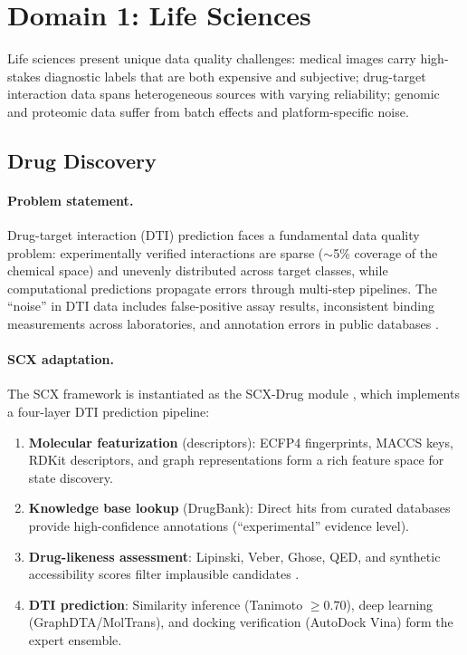 \documentclass[twocolumn]{article}
\theoremstyle{definition}
\begin{document}
\section{Domain 1: Life Sciences}

Life sciences present unique data quality challenges: medical images carry high-stakes diagnostic labels that are both expensive and subjective; drug-target interaction data spans heterogeneous sources with varying reliability; genomic and proteomic data suffer from batch effects and platform-specific noise.

\subsection{Drug Discovery}

\paragraph{Problem statement.}
Drug-target interaction (DTI) prediction faces a fundamental data quality problem: experimentally verified interactions are sparse ($\sim$5\% coverage of the chemical space) and unevenly distributed across target classes, while computational predictions propagate errors through multi-step pipelines. The ``noise'' in DTI data includes false-positive assay results, inconsistent binding measurements across laboratories, and annotation errors in public databases \cite{chembl, bindingdb}.

\paragraph{SCX adaptation.}
The SCX framework is instantiated as the SCX-Drug module \cite{scxlife}, which implements a four-layer DTI prediction pipeline:

\begin{enumerate}[nosep,leftmargin=*,itemsep=2pt]
  \item \textbf{Molecular featurization} (descriptors): ECFP4 fingerprints, MACCS keys, RDKit descriptors, and graph representations form a rich feature space for state discovery.
  \item \textbf{Knowledge base lookup} (DrugBank): Direct hits from curated databases provide high-confidence annotations (``experimental'' evidence level).
  \item \textbf{Drug-likeness assessment}: Lipinski, Veber, Ghose, QED, and synthetic accessibility scores filter implausible candidates \cite{lipinski1997, bickerton2012}.
  \item \textbf{DTI prediction}: Similarity inference (Tanimoto $\geq 0.70$), deep learning (GraphDTA/MolTrans), and docking verification (AutoDock Vina) form the expert ensemble.
\end{enumerate}
\end{document}

